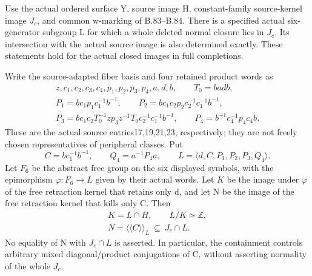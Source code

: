 Use the actual ordered surface Y, source image H, constant-family
source-kernel image \(J_c\), and common w-marking of B.83--B.84.
There is a specified actual six-generator subgroup L for which a whole
deleted normal closure lies in \(J_c\). Its intersection with the
actual source image is also determined exactly. These statements hold
for the actual closed images in full completions.

Write the source-adapted fiber basis and four retained product words as
\[
\begin{gathered}
 z,c_1,c_2,c_3,c_4,p_1,p_2,p_3,p_4,a,d,b,\qquad T_0=badb,\\
 P_1=bc_1p_1c_1^{-1}b^{-1},\qquad
 P_2=bc_1c_2p_2c_2^{-1}c_1^{-1}b^{-1},\\
 P_3=bc_1c_2T_0^{-1}zp_3z^{-1}T_0c_2^{-1}c_1^{-1}b^{-1},
 \qquad P_4=b^{-1}c_4^{-1}p_4c_4b .
\end{gathered}
\tag{B.86.1}
\]
These are the actual source entries17,19,21,23, respectively;
they are not freely chosen representatives of peripheral classes.
Put
\[
 C=bc_1^{-1}b^{-1},\qquad Q_4=a^{-1}P_4a,\qquad
 L=\langle d,C,P_1,P_2,P_3,Q_4\rangle .
\tag{B.86.2}
\]
Let \(F_6\) be the abstract free group on the six displayed symbols,
with the epimorphism \(\varphi:F_6\to L\) given by their actual words.
Let \(K\) be the image under \(\varphi\) of the free retraction kernel
that retains only d, and let N be the image of the free retraction
kernel that kills only C. Then
\[
\begin{gathered}
 K=L\cap H,\qquad L/K\simeq\mathbb Z,\\
 N=\langle\!\langle C\rangle\!\rangle_L
       \ \subseteq\ J_c\cap L .
\end{gathered}
\tag{B.86.3}
\]
No equality of N with \(J_c\cap L\) is asserted. In particular, the
containment controls arbitrary mixed diagonal/product conjugations of
C, without asserting normality of the whole \(J_c\).

